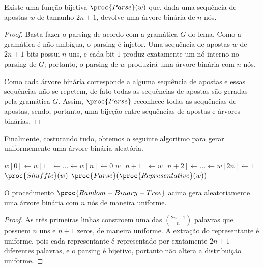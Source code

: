 \begin{corollary}
    Existe uma função bijetiva $\proc{Parse}(w)$
    que, dada uma sequência de apostas $w$ de tamanho $2n+1$,
    devolve uma árvore binária de $n$ nós.
\end{corollary}

\begin{proof}
    Basta fazer o parsing de acordo com a gramática $G$ do lema.
    Como a gramática é não-ambígua,
    o parsing é injetor.
    Uma sequência de apostas $w$ de $2n+1$ bits possui $n$ uns,
    e cada bit $1$ produz exatamente um nó interno no parsing de $G$;
    portanto, o parsing de $w$ produzirá uma árvore binária com $n$ nós.

    Como cada árvore binária corresponde a alguma sequência de apostas
    e essas sequências não se repetem,
    de fato todas as sequências de apostas são geradas pela gramática $G$.
    Assim, $\proc{Parse}$ reconhece todas as sequências de apostas,
    sendo, portanto, uma bijeção entre sequências de apostas e árvores binárias.
\end{proof}

Finalmente, costurando tudo,
obtemos o seguinte algoritmo para gerar uniformemente uma árvore binária aleatória.

\begin{codebox}
    \li $w[0] \gets w[1] \gets \dots \gets w[n] \gets 0$
    \li $w[n+1] \gets w[n+2] \gets \dots \gets w[2n] \gets 1$
    \li $\proc{Shuffle}(w)$
    \li \Return $\proc{Parse}(\proc{Representative}(w))$
\end{codebox}

\begin{theorem}
    O procedimento $\proc{Random-Binary-Tree}$ acima
    gera aleatoriamente uma árvore binária com $n$ nós de maneira uniforme.
\end{theorem}

\begin{proof}
    As três primeiras linhas constroem uma das $\binom{2n+1}{n}$ palavras
    que possuem $n$ uns e $n+1$ zeros,
    de maneira uniforme.
    A extração do representante é uniforme,
    pois cada representante é representado por exatamente $2n+1$ diferentes palavras,
    e o parsing é bijetivo,
    portanto não altera a distribuição uniforme.
\end{proof}
